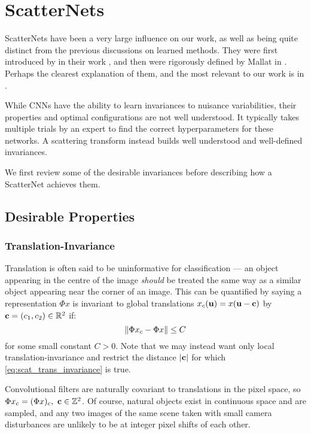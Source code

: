 \section{ScatterNets}\label{sec:ch2:scatternets}
  ScatterNets have been a very large influence on
  our work, as well as being quite distinct from the previous discussions on
  learned methods. They were first introduced by
  \citeauthor{bruna_classification_2011} in their work
  \cite{bruna_classification_2011}, and then were rigorously defined by Mallat
  in \cite{mallat_group_2012}. Perhaps the clearest explanation of them, and the most
  relevant to our work is in \cite{bruna_invariant_2013}.

  While CNNs have the ability to learn invariances to nuisance variabilities,
  their properties and optimal configurations are not well understood.
  It typically takes multiple trials
  by an expert to find the correct hyperparameters for these networks. A
  scattering transform instead builds well understood and well-defined invariances.

  We first review some of the desirable invariances before describing how a
  ScatterNet achieves them.

  \subsection{Desirable Properties}\label{sec:ch2:scat_props}
\subsubsection{Translation-Invariance}
  Translation is often said to be uninformative for classification --- an
  object appearing in the centre of the image \emph{should} be treated the same way as
  a similar object appearing near the corner of an image. This can be quantified
  by saying a representation $\Phi x$ is invariant to global translations $x_c(\mathbf{u}) =
  x(\mathbf{u}-\mathbf{c})$ by $\mathbf{c}=(c_1,c_2) \in \mathbb{R}^2$ if:
  \begin{equation}\label{eq:scat_trans_invariance}
    \left\lVert \Phi x_c - \Phi x \right\rVert \leq C
  \end{equation}
  for some small constant $C>0$.
  Note that we may instead want only local translation-invariance and
  restrict the distance $|\mathbf{c}|$ for which \eqref{eq:scat_trans_invariance}
  is true.

  Convolutional filters are naturally covariant to translations in the pixel space,
  so $\Phi x_c = (\Phi x)_c,\ \bmu{c} \in \mathbb{Z}^2$. Of course, natural objects
  exist in continuous space and are sampled, and any two images of the same
  scene taken with small camera disturbances are unlikely to be at integer pixel
  shifts of each other.

